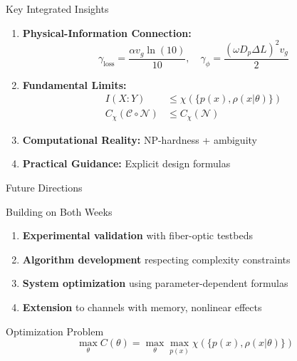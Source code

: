 \documentclass{beamer}
\theoremstyle{definition}
\theoremstyle{plain}
\begin{document}
\begin{frame}{Key Integrated Insights}
    \small
    \begin{enumerate}
        \item \textbf{Physical-Information Connection:}
        \[
        \gamma_{\text{loss}} = \frac{\alpha v_g \ln(10)}{10}, \quad \gamma_\phi = \frac{(\omega D_p \Delta L)^2 v_g}{2}
        \]
        
        \item \textbf{Fundamental Limits:}
        \vspace{-0.1cm}
        \begin{align*}
        I(X:Y) &\leq \chi(\{p(x), \rho(x|\theta)\}) \\
        C_\chi(\mathcal{C} \circ \mathcal{N}) &\leq C_\chi(\mathcal{N})
        \end{align*}
        
        \item \textbf{Computational Reality:} NP-hardness + ambiguity
        
        \item \textbf{Practical Guidance:} Explicit design formulas
    \end{enumerate}
\end{frame}

\begin{frame}{Future Directions}
    \begin{block}{Building on Both Weeks}
        \begin{enumerate}
            \item \textbf{Experimental validation} with fiber-optic testbeds
            \item \textbf{Algorithm development} respecting complexity constraints
            \item \textbf{System optimization} using parameter-dependent formulas
            \item \textbf{Extension} to channels with memory, nonlinear effects
        \end{enumerate}
    \end{block}
    
    \vspace{0.3cm}
    
    \begin{alertblock}{Optimization Problem}
        \[
        \max_{\theta} C(\theta) = \max_{\theta} \max_{p(x)} \chi(\{p(x), \rho(x|\theta)\})
        \]
    \end{alertblock}
\end{frame}
\end{document}
